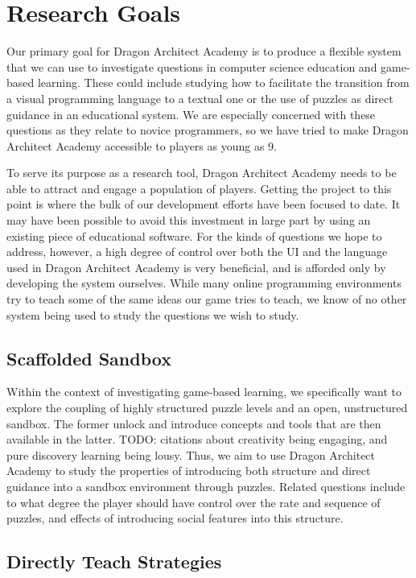 \documentclass{sig-alternate}
\newcommand{\TODO}[1]{{\color{red} TODO: #1}}
\newcommand{\gametitle}{{\color{RoyalPurple} Dragon Architect Academy}}
\begin{document}
\section{Research Goals}
\label{sec:goals}
Our primary goal for \gametitle{} is to produce a flexible system that we can use to investigate questions in computer science education and game-based learning. These could include studying how to facilitate the transition from a visual programming language to a textual one or the use of puzzles as direct guidance in an educational system. We are especially concerned with these questions as they relate to novice programmers, so we have tried to make \gametitle{} accessible to players as young as 9.

To serve its purpose as a research tool, \gametitle{} needs to be able to attract and engage a population of players. Getting the project to this point is where the bulk of our development efforts have been focused to date. It may have been possible to avoid this investment in large part by using an existing piece of educational software. For the kinds of questions we hope to address, however, a high degree of control over both the UI and the language used in \gametitle{} is very beneficial, and is afforded only by developing the system ourselves. While many online programming environments try to teach some of the same ideas our game tries to teach, we know of no other system being used to study the questions we wish to study. 

\subsection{Scaffolded Sandbox}
Within the context of investigating game-based learning, we specifically want to explore the coupling of highly structured puzzle levels and an open, unstructured sandbox. The former unlock and introduce concepts and tools that are then available in the latter. \TODO{citations about creativity being engaging, and pure discovery learning being lousy}. Thus, we aim to use \gametitle{} to study the properties of introducing both structure and direct guidance into a sandbox environment through puzzles. Related questions include to what degree the player should have control over the rate and sequence of puzzles, and effects of introducing social features into this structure. 

\subsection{Directly Teach Strategies}
\end{document}
